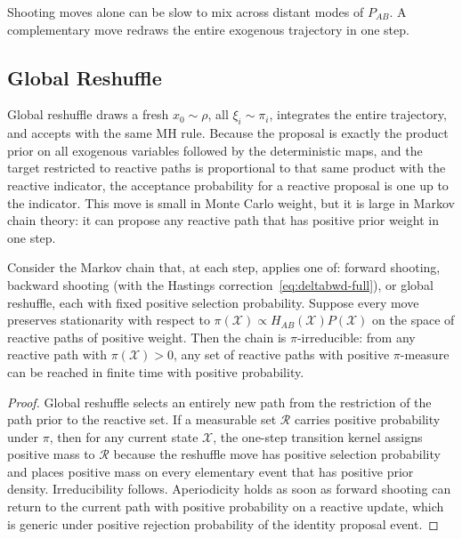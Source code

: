 Shooting moves alone can be slow to mix across distant modes of $P_{AB}$. A
complementary move redraws the entire exogenous trajectory in one step.

\subsection{Global Reshuffle}

Global reshuffle draws a fresh $x_0 \sim \rho$, all $\xi_i \sim \pi_i$, integrates the entire trajectory, and accepts with the same MH rule. Because the proposal is exactly the product prior on all exogenous variables followed by the deterministic maps, and the target restricted to reactive paths is proportional to that same product with the reactive indicator, the acceptance probability for a reactive proposal is one up to the indicator. This move is small in Monte Carlo weight, but it is large in Markov chain theory: it can propose any reactive path that has positive prior weight in one step.

\begin{theorem}
\label{thm:ergodicity-full}
Consider the Markov chain that, at each step, applies one of: forward shooting, backward shooting (with the Hastings correction~\eqref{eq:deltabwd-full}), or global reshuffle, each with fixed positive selection probability. Suppose every move preserves stationarity with respect to $\pi(\mathcal{X}) \propto H_{AB}(\mathcal{X}) P(\mathcal{X})$ on the space of reactive paths of positive weight. Then the chain is $\pi$-irreducible: from any reactive path with $\pi(\mathcal{X})>0$, any set of reactive paths with positive $\pi$-measure can be reached in finite time with positive probability.
\end{theorem}

\begin{proof}
Global reshuffle selects an entirely new path from the restriction of the path prior to the reactive set. If a measurable set $\mathcal{R}$ carries positive probability under $\pi$, then for any current state $\mathcal{X}$, the one-step transition kernel assigns positive mass to $\mathcal{R}$ because the reshuffle move has positive selection probability and places positive mass on every elementary event that has positive prior density. Irreducibility follows. Aperiodicity holds as soon as forward shooting can return to the current path with positive probability on a reactive update, which is generic under positive rejection probability of the identity proposal event.
\end{proof}

